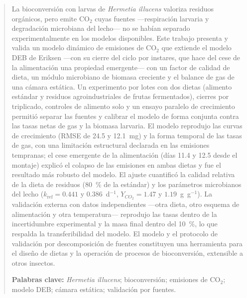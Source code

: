 \begin{abstract}
\noindent La bioconversión con larvas de \textit{Hermetia illucens} valoriza residuos orgánicos, pero emite CO$_2$ cuyas fuentes ---respiración larvaria y degradación microbiana del lecho--- no se habían separado experimentalmente en los modelos disponibles. Este trabajo presenta y valida un modelo dinámico de emisiones de CO$_2$ que extiende el modelo DEB de Eriksen ---con su cierre del ciclo por instares, que hace del cese de la alimentación una propiedad emergente--- con un factor de calidad de dieta, un módulo microbiano de biomasa creciente y el balance de gas de una cámara estática. Un experimento por lotes con dos dietas (alimento estándar y residuos agroindustriales de frutas fermentados), cierres por triplicado, controles de alimento solo y un ensayo paralelo de crecimiento permitió separar las fuentes y calibrar el modelo de forma conjunta contra las tasas netas de gas y la biomasa larvaria. El modelo reprodujo las curvas de crecimiento (RMSE de 24.5 y 12.1~mg) y la forma temporal de las tasas de gas, con una limitación estructural declarada en las emisiones tempranas; el cese emergente de la alimentación (días 11.4 y 12.5 desde el montaje) explicó el colapso de las emisiones en ambas dietas y fue el resultado más robusto del modelo. El ajuste cuantificó la calidad relativa de la dieta de residuos (80~\% de la estándar) y los parámetros microbianos del lecho ($k_{\mathrm{ref}} = 0.441$ y $0.386$~d$^{-1}$, $Y_{CO_2} = 1.47$ y $1.19$~g~g$^{-1}$). La validación externa con datos independientes ---otra dieta, otro esquema de alimentación y otra temperatura--- reprodujo las tasas dentro de la incertidumbre experimental y la masa final dentro del 10~\%, lo que respalda la transferibilidad del modelo. El modelo y el protocolo de validación por descomposición de fuentes constituyen una herramienta para el diseño de dietas y la operación de procesos de bioconversión, extensible a otros insectos.

\vspace{6pt}
\noindent\textbf{Palabras clave:} \textit{Hermetia illucens}; bioconversión; emisiones de CO$_2$; modelo DEB; cámara estática; validación por fuentes.
\end{abstract}
